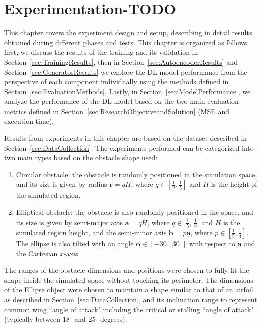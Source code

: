 
\chapter{Experimentation-TODO}
\label{ch:Experimentation}

This chapter covers the experiment design and setup, describing in detail results obtained during different phases and tests. This chapter is organized as follows: first, we discuss the results of the training and its validation in Section~\ref{sec:TrainingResults}, then in Section~\ref{sec:AutoencoderResults} and Section~\ref{sec:GeneratorResults} we explore the DL model performance from the perspective of each component individually using the methods defined in Section~\ref{sec:EvaluationMethods}.  Lastly, in Section~\ref{sec:ModelPerformance}, we analyze the performance of the DL model based on the two main evaluation metrics defined in Section~\ref{sec:ResearchObjectiveandSolution} (MSE and execution time).

Results from experiments in this chapter are based on the dataset described in Section~\ref{sec:DataCollection}. The experiments performed can be categorized into two main types based on the obstacle shape used:
\begin{enumerate}
    \item Circular obstacle: the obstacle is randomly positioned in the simulation space, and its size is given by radius $\textbf{r} = qH$, where $q \in [\frac{1}{9}, \frac{1}{5}]$ and $H$ is the height of the simulated region.
    
    \item Elliptical obstacle: the obstacle is also randomly positioned in the space, and its size is given by semi-major axis $\textbf{a}=qH$, where $q \in [\frac{1}{5}$, $\frac{1}{3}]$ and $H$ is the simulated region height, and the semi-minor axis $\textbf{b}=p\textbf{a}$, where $p \in [\frac{1}{5}, \frac{1}{4}]$. The ellipse is also tilted with an angle $\boldsymbol{\alpha} \in [-30^\circ, 30^\circ]$ with respect to $\textbf{a}$ and the Cartesian $x$-axis.
\end{enumerate}

The ranges of the obstacle dimensions and positions were chosen to fully fit the shape inside the simulated space without touching its perimeter. The dimensions of the Ellipse object were chosen to maintain a shape similar to that of an airfoil as described in Section~\ref{sec:DataCollection}, and its inclination range to represent common wing ``angle of attack" including the critical or stalling ``angle of attack" (typically between $18^\circ$ and $25^\circ$ degrees)\cite{abbott_ira_h_summary_1945}.


